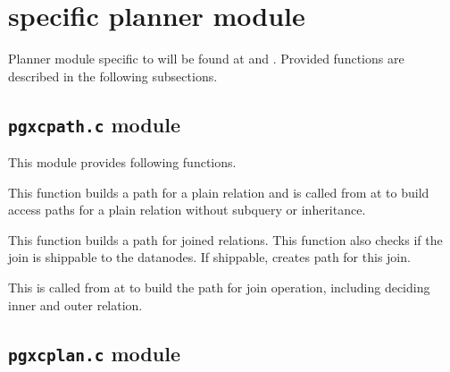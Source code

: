 
\section{\label{sec:planner}\XC{} specific planner module}

  Planner module specific to \XC{} will be found at  and
  .
  Provided functions are described in the following subsections.



\subsection{\label{additional:pgxcpath}\texttt{pgxcpath.c} module}

  This module provides following functions.
  
  
      This function builds a  path for a plain relation and
      is called from  at 
      to build access paths for a plain relation without subquery or
      inheritance.
  
  
      This function builds a  path for joined relations.
      This function also checks if the join is shippable to the datanodes.
      If shippable, creates  path for this join.
      
      This is called from  at 
      to build the path for join operation, including deciding inner and
      outer relation.
    


\subsection{\texttt{pgxcplan.c} module}

